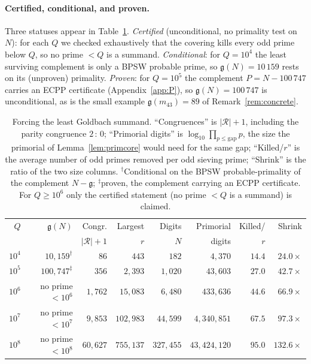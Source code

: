 \documentclass[11pt]{article}
\theoremstyle{plain}
\theoremstyle{definition}
\theoremstyle{remark}
\newcommand{\N}{N}
\newcommand{\g}{\mathfrak{g}}
\begin{document}
\paragraph{Certified, conditional, and proven.} Three statuses appear in
Table~\ref{tab:results}. \emph{Certified} (unconditional, no primality test on
$\N$): for each $Q$ we checked exhaustively that the covering kills every odd
prime below $Q$, so no prime $<Q$ is a summand. \emph{Conditional}: for $Q=10^4$
the least surviving complement is only a BPSW probable prime, so $\g(\N)=10\,159$
rests on its (unproven) primality. \emph{Proven}: for $Q=10^5$ the complement
$P=\N-100\,747$ carries an ECPP certificate (Appendix~\ref{app:P}), so
$\g(\N)=100\,747$ is unconditional, as is the small example $\g(m_{43})=89$ of
Remark~\ref{rem:concrete}.

\begin{table}[h]
\centering
\caption{Forcing the least Goldbach summand. ``Congruences'' is
$|\mathcal R|+1$, including the parity congruence $2\,{:}\,0$; ``Primorial
digits'' is $\log_{10}\prod_{p\le \text{gap}}p$, the size the primorial of
Lemma~\ref{lem:primcore} would need for the same gap; ``Killed/$r$'' is the
average number of odd primes removed per odd sieving prime; ``Shrink'' is the
ratio of the two size columns. $^\dagger$Conditional on the BPSW
probable-primality of the complement $\N-\g$; $^\ddagger$proven, the complement
carrying an ECPP certificate. For $Q\ge10^6$ only the
certified statement (no prime $<Q$ is a summand) is claimed.}\label{tab:results}
\begin{tabular}{rrrrrrrr}
\toprule
$Q$ & $\g(\N)$ & Congr. & Largest & Digits & Primorial & Killed/ & Shrink\\
 & & $|\mathcal R|{+}1$ & $r$ & $\N$ & digits & $r$ & \\
\midrule
$10^{4}$ & $10{,}159^\dagger$ & $86$ & $443$ & $182$ & $4{,}370$ & $14.4$ & $24.0\times$\\
$10^{5}$ & $100{,}747^\ddagger$ & $356$ & $2{,}393$ & $1{,}020$ & $43{,}603$ & $27.0$ & $42.7\times$\\
$10^{6}$ & no prime $<10^{6}$ & $1{,}762$ & $15{,}083$ & $6{,}480$ & $433{,}636$ & $44.6$ & $66.9\times$\\
$10^{7}$ & no prime $<10^{7}$ & $9{,}853$ & $102{,}983$ & $44{,}599$ & $4{,}340{,}851$ & $67.5$ & $97.3\times$\\
$10^{8}$ & no prime $<10^{8}$ & $60{,}627$ & $755{,}137$ & $327{,}455$ & $43{,}424{,}120$ & $95.0$ & $132.6\times$\\
\bottomrule
\end{tabular}
\end{table}
\end{document}
